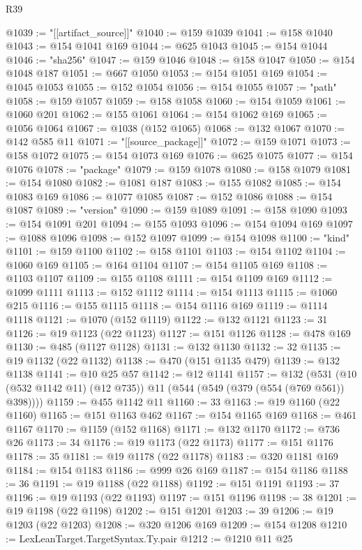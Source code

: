 \begin{lexlean}{R39}
\begin{coremodule}
@1039 := "[[artifact_source]]"
@1040 := @159 @1039
@1041 := @158 @1040
@1043 := @154 @1041 @169
@1044 := @625 @1043
@1045 := @154 @1044
@1046 := "sha256"
@1047 := @159 @1046
@1048 := @158 @1047
@1050 := @154 @1048 @187
@1051 := @667 @1050
@1053 := @154 @1051 @169
@1054 := @1045 @1053
@1055 := @152 @1054
@1056 := @154 @1055
@1057 := "path"
@1058 := @159 @1057
@1059 := @158 @1058
@1060 := @154 @1059
@1061 := @1060 @201
@1062 := @155 @1061
@1064 := @154 @1062 @169
@1065 := @1056 @1064
@1067 := @1038 (@152 @1065)
@1068 := @132 @1067
@1070 := @142 @585 @11
@1071 := "[[source_package]]"
@1072 := @159 @1071
@1073 := @158 @1072
@1075 := @154 @1073 @169
@1076 := @625 @1075
@1077 := @154 @1076
@1078 := "package"
@1079 := @159 @1078
@1080 := @158 @1079
@1081 := @154 @1080
@1082 := @1081 @187
@1083 := @155 @1082
@1085 := @154 @1083 @169
@1086 := @1077 @1085
@1087 := @152 @1086
@1088 := @154 @1087
@1089 := "version"
@1090 := @159 @1089
@1091 := @158 @1090
@1093 := @154 @1091 @201
@1094 := @155 @1093
@1096 := @154 @1094 @169
@1097 := @1088 @1096
@1098 := @152 @1097
@1099 := @154 @1098
@1100 := "kind"
@1101 := @159 @1100
@1102 := @158 @1101
@1103 := @154 @1102
@1104 := @1060 @169
@1105 := @164 @1104
@1107 := @154 @1105 @169
@1108 := @1103 @1107
@1109 := @155 @1108
@1111 := @154 @1109 @169
@1112 := @1099 @1111
@1113 := @152 @1112
@1114 := @154 @1113
@1115 := @1060 @215
@1116 := @155 @1115
@1118 := @154 @1116 @169
@1119 := @1114 @1118
@1121 := @1070 (@152 @1119)
@1122 := @132 @1121
@1123 := 31
@1126 := @19 @1123 (@22 @1123)
@1127 := @151 @1126
@1128 := @478 @169
@1130 := @485 (@1127 @1128)
@1131 := @132 @1130
@1132 := 32
@1135 := @19 @1132 (@22 @1132)
@1138 := @470 (@151 @1135 @479)
@1139 := @132 @1138
@1141 := @10 @25 @57
@1142 := @12 @1141
@1157 := @132
    (@531 (@10 (@532 @1142 @11) (@12 @735)) @11 (@544 (@549 (@379 (@554 (@769 @561)) @398))))
@1159 := @455 @1142 @11
@1160 := 33
@1163 := @19 @1160 (@22 @1160)
@1165 := @151 @1163 @462
@1167 := @154 @1165 @169
@1168 := @461 @1167
@1170 := @1159 (@152 @1168)
@1171 := @132 @1170
@1172 := @736 @26
@1173 := 34
@1176 := @19 @1173 (@22 @1173)
@1177 := @151 @1176
@1178 := 35
@1181 := @19 @1178 (@22 @1178)
@1183 := @320 @1181 @169
@1184 := @154 @1183
@1186 := @999 @26 @169
@1187 := @154 @1186
@1188 := 36
@1191 := @19 @1188 (@22 @1188)
@1192 := @151 @1191
@1193 := 37
@1196 := @19 @1193 (@22 @1193)
@1197 := @151 @1196
@1198 := 38
@1201 := @19 @1198 (@22 @1198)
@1202 := @151 @1201
@1203 := 39
@1206 := @19 @1203 (@22 @1203)
@1208 := @320 @1206 @169
@1209 := @154 @1208
@1210 := LexLeanTarget.TargetSyntax.Ty.pair
@1212 := @1210 @11 @25

\end{coremodule}
\end{lexlean}
